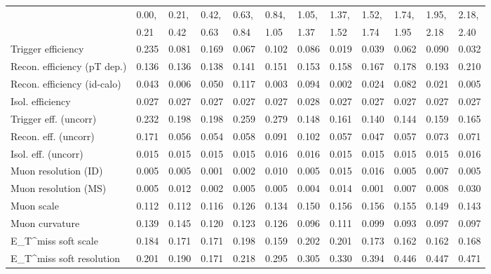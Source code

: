 \begin{tabular}{l|p{0.6cm}p{0.6cm}p{0.6cm}p{0.6cm}p{0.6cm}p{0.6cm}p{0.6cm}p{0.6cm}p{0.6cm}p{0.6cm}p{0.6cm}}
\hline
   & 0.00, & 0.21, & 0.42, & 0.63, & 0.84, & 1.05, & 1.37, & 1.52, & 1.74, & 1.95, & 2.18,  \\ 
   & 0.21 & 0.42 & 0.63 & 0.84 & 1.05 & 1.37 & 1.52 & 1.74 & 1.95 & 2.18 & 2.40  \\ 
\hline
Trigger efficiency                       & 0.235 & 0.081 & 0.169 & 0.067 & 0.102 & 0.086 & 0.019 & 0.039 & 0.062 & 0.090 & 0.032 \\
Recon. efficiency (pT dep.)              & 0.136 & 0.136 & 0.138 & 0.141 & 0.151 & 0.153 & 0.158 & 0.167 & 0.178 & 0.193 & 0.210 \\
Recon. efficiency (id-calo)              & 0.043 & 0.006 & 0.050 & 0.117 & 0.003 & 0.094 & 0.002 & 0.024 & 0.082 & 0.021 & 0.005 \\
Isol. efficiency                         & 0.027 & 0.027 & 0.027 & 0.027 & 0.027 & 0.028 & 0.027 & 0.027 & 0.027 & 0.027 & 0.027 \\
Trigger eff. (uncorr)                    & 0.232 & 0.198 & 0.198 & 0.259 & 0.279 & 0.148 & 0.161 & 0.140 & 0.144 & 0.159 & 0.165 \\
Recon. eff. (uncorr)                     & 0.171 & 0.056 & 0.054 & 0.058 & 0.091 & 0.102 & 0.057 & 0.047 & 0.057 & 0.073 & 0.071 \\
Isol. eff. (uncorr)                      & 0.015 & 0.015 & 0.015 & 0.015 & 0.016 & 0.016 & 0.015 & 0.015 & 0.015 & 0.015 & 0.016 \\
Muon resolution (ID)                     & 0.005 & 0.005 & 0.001 & 0.002 & 0.010 & 0.005 & 0.015 & 0.016 & 0.005 & 0.007 & 0.005 \\
Muon resolution (MS)                     & 0.005 & 0.012 & 0.002 & 0.005 & 0.005 & 0.004 & 0.014 & 0.001 & 0.007 & 0.008 & 0.030 \\
Muon scale                               & 0.112 & 0.112 & 0.116 & 0.126 & 0.134 & 0.150 & 0.156 & 0.156 & 0.155 & 0.149 & 0.143 \\
Muon curvature                           & 0.139 & 0.145 & 0.120 & 0.123 & 0.126 & 0.096 & 0.111 & 0.099 & 0.093 & 0.097 & 0.097 \\
E_{T}^{miss} soft scale                  & 0.184 & 0.171 & 0.171 & 0.198 & 0.159 & 0.202 & 0.201 & 0.173 & 0.162 & 0.162 & 0.168 \\
E_{T}^{miss} soft resolution             & 0.201 & 0.190 & 0.171 & 0.218 & 0.295 & 0.305 & 0.330 & 0.394 & 0.446 & 0.447 & 0.471 \\

\end{tabular}
